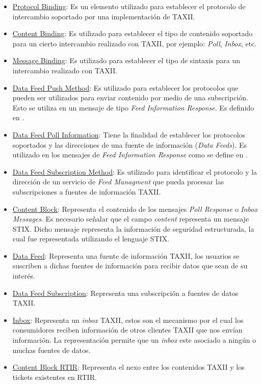 	
	\begin{itemize}
		\item \underline{Protocol Binding}: Es un elemento utilizado para establecer el protocolo de intercambio
			soportado por una implementación de TAXII.
		\item \underline{Content Binding}: Es utilizado para establecer el tipo de contenido soportado para un
			cierto intercambio realizado con TAXII, por ejemplo:
		\textit{Poll},
	\textit{Inbox}, etc.
	\item \underline{Message Binding}: Es utilizado para establecer el tipo de sintaxis para un intercambio
		realizado con TAXII.
	\item \underline{Data Feed Push Method}: Es utilizado para establecer los protocolos que pueden ser
		utilizados para enviar contenido por medio de una subscripción. Esto se utiliza en un mensaje de tipo
	\textit{Feed Information Response}. Es definido en \cite{M14}.
	\item \underline{Data Feed Poll Information}: Tiene la finalidad de establecer los protocolos soportados y
		las direcciones de una fuente de información (\textit{Data
			Feeds}). Es utilizado en los mensajes de \textit{Feed Information
			Response} como se define en \cite{M14}.
	\item \underline{Data Feed Subscription Method}: Es utilizado para identificar el protocolo y la dirección
		de un servicio de \textit{Feed Managment} que pueda procesar las
		subscripciones a fuentes de información TAXII.
	\item \underline{Content Block}: Representa el contenido de los mensajes
\textit{Poll Response }o \textit{Inbox
		Messages}. Es necesario señalar que el campo
\textit{content} representa un mensaje STIX. Dicho mensaje
representa la información de seguridad estructurada, la cual fue representada utilizando el lenguaje STIX.
\item \underline{Data Feed}: Representa una fuente de información TAXII, los usuarios se suscriben a
	dichas fuentes de información para recibir datos que sean de su interés.
\item \underline{Data Feed Subscription}: Representa una subscripción a fuentes de datos TAXII.
\item \underline{Inbox}: Representa un \textit{inbox
	}TAXII, estos son el mecanismo por el cual los consumidores reciben información de otros
	clientes TAXII que nos envían información. La representación permite que un
\textit{inbox} este asociado a ningún o muchas fuentes de datos.

\item \underline{Content Block RTIR}: Representa el nexo entre los contenidos TAXII y los tickets
	existentes en RTIR.
\end{itemize}